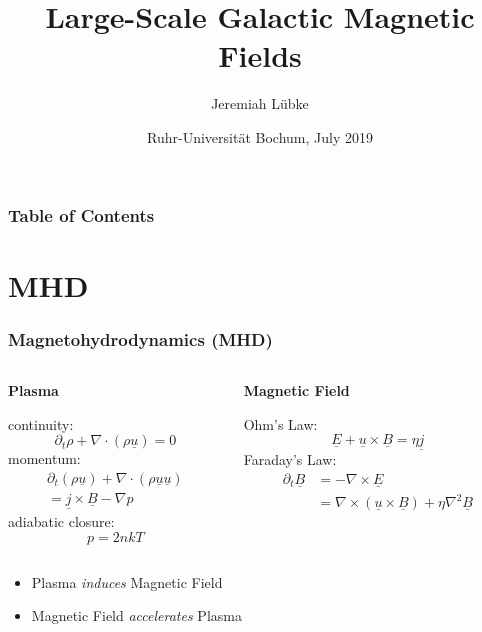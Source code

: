 \documentclass[mathserif]{beamer}
\title{Large-Scale Galactic Magnetic Fields}
\author{Jeremiah Lübke}
\date{Ruhr-Universität Bochum, July 2019}
\newcommand{\partt}{\partial_{t}}
\newcommand{\Div}{\nabla\cdot}
\newcommand{\Grad}{\nabla}
\newcommand{\Curl}{\nabla\times}
\newcommand{\Lap}{\nabla^{2}}
\newcommand{\uvec}{\underline{u}}
\newcommand{\jvec}{\underline{j}}
\newcommand{\Bvec}{\underline{B}}
\newcommand{\Evec}{\underline{E}}
\begin{document}
\setlength{\abovedisplayskip}{6pt}
\setlength{\belowdisplayskip}{6pt}


\frame{\titlepage}

\begin{frame}
    \frametitle{Table of Contents}
    \tableofcontents
\end{frame}


\addtocounter{framenumber}{-2}


\section{MHD}
\begin{frame}
    \frametitle{Magnetohydrodynamics (MHD)}
    \begin{columns}[T]
        \begin{column}[T]{.5\textwidth}
            \begin{tcolorbox}
            \begin{center}
                \textbf{Plasma}
            \end{center}
            continuity: \[\partt\rho+\Div(\rho\uvec)=0\]
            momentum:
            \begin{align*}
                \partt(\rho\uvec)+\Div(\rho\uvec\uvec) \\
                =\jvec\times\Bvec-\Grad{p}
            \end{align*}
            adiabatic closure: \[p=2nkT\]
            \end{tcolorbox}
        \end{column}

        \begin{column}[T]{.5\textwidth}
            \begin{tcolorbox}
            \begin{center}
                \textbf{Magnetic Field}
            \end{center}
            Ohm's Law: \[\Evec+\uvec\times\Bvec=\eta\jvec\]
            Faraday's Law:
            \begin{align*}
                \partt\Bvec&=-\Curl\Evec \\
                &=\Curl(\uvec\times\Bvec)+\eta\Lap\Bvec
            \end{align*}
            \end{tcolorbox}
        \end{column}
    \end{columns}
    \medskip
    \begin{itemize}
        \item Plasma \emph{induces} Magnetic Field
        \item Magnetic Field \emph{accelerates} Plasma
    \end{itemize}
\end{frame}
\end{document}
